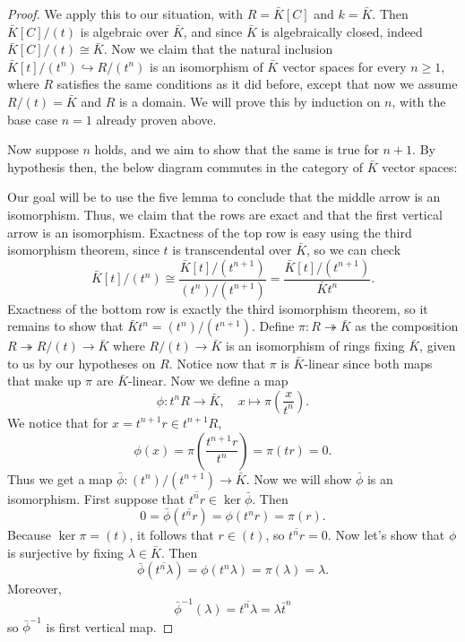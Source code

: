 \documentclass{article}
\theoremstyle{customplain}
\theoremstyle{customdef}
\theoremstyle{definition} %
\renewcommand{\ge}{\geqslant}
\begin{document}
\begin{proof}
    We apply this to our situation, with $R=\bar K[C]$ and $k=\bar K$. Then $\bar K[C]/(t)$ is algebraic over $\bar K$, and since $\bar K$ is algebraically closed, indeed $\bar K[C]/(t) \cong \bar K.$ Now we claim that the natural inclusion $\bar K[t]/(t^n) \hookrightarrow R/(t^n)$ is an isomorphism of $\bar K$ vector spaces for every $n\ge 1$, where $R$ satisfies the same conditions as it did before, except that now we assume $R/(t)=\bar K$ and $R$ is a domain. We will prove this by induction on $n$, with the base case $n=1$ already proven above.

    Now suppose $n$ holds, and we aim to show that the same is true for $n+1.$ By hypothesis then, the below diagram commutes in the category of $\bar K$ vector spaces: 
    \begin{center}
    \end{center}

    Our goal will be to use the five lemma to conclude that the middle arrow is an isomorphism. Thus, we claim that the rows are exact and that the first vertical arrow is an isomorphism. Exactness of the top row is easy using the third isomorphism theorem, since $t$ is transcendental over $\bar K$, so we can check $$\bar K[t]/(t^n) \cong \frac{\bar K[t]/(t^{n+1})}{(t^n)/(t^{n+1})} = \frac{\bar K[t]/(t^{n+1})}{\bar K t^n}.$$ Exactness of the bottom row is exactly the third isomorphism theorem, so it remains to show that $\bar K t^n = (t^n)/(t^{n+1}).$ Define $\pi:R \twoheadrightarrow \bar K$ as the composition $R\twoheadrightarrow R/(t) \to \bar K$ where $R/(t)\to \bar K$ is an isomorphism of rings fixing $\bar K$, given to us by our hypotheses on $R.$ Notice now that $\pi$ is $\bar K$-linear since both maps that make up $\pi$ are $\bar K$-linear. Now we define a map $$\phi:t^nR \to \bar K, \quad x \mapsto \pi(\frac{x}{t^n}).$$
    We notice that for $x=t^{n+1}r\in t^{n+1}R$,
    \[
    \phi(x)=\pi(\frac{t^{n+1}r}{t^n})=\pi(tr)=0.
    \]
    Thus we get a map $\bar \phi :(t^n)/(t^{n+1}) \to \bar K$. Now we will show $\bar \phi$ is an isomorphism. First suppose that $\overline{t^n r}\in \ker \bar \phi.$ Then
    \[
    0=\bar \phi(\overline{t^n r}) = \phi(t^n r) = \pi(r).
    \]
    Because $\ker \pi = (t)$, it follows that $r\in (t)$, so $\overline{t^n r} = 0$. Now let's show that $\phi$ is surjective by fixing $\lambda \in \bar K.$ Then
    \[
    \bar \phi(\overline{t^n \lambda}) = \phi(t^n \lambda) = \pi(\lambda) = \lambda.
    \]
    Moreover,
    \[
    \bar \phi^{-1}(\lambda) = \overline{t^n \lambda} = \lambda \bar t^n
    \]
    so $\bar \phi^{-1}$ is first vertical map.


\end{proof}
\end{document}

